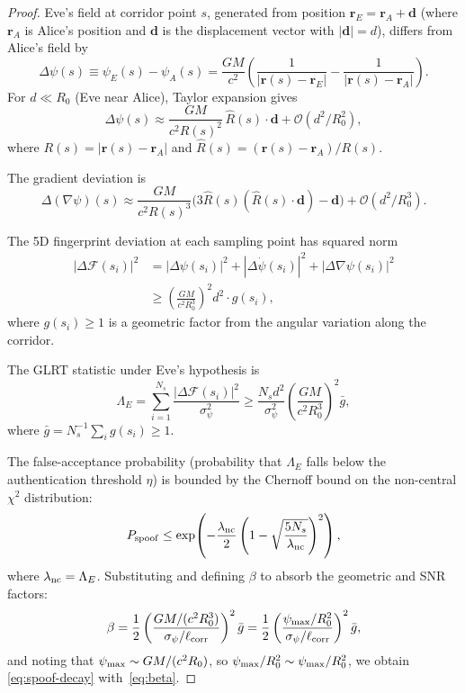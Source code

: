 \documentclass[twocolumn,superscriptaddress,prd,nofootinbib]{revtex4-2}
\newcommand{\order}[1]{\mathcal{O}(#1)}
\newcommand{\Fingerprint}{\mathcal{F}}
\begin{document}
\begin{proof}
Eve's field at corridor point $s$, generated from position
$\mathbf{r}_E = \mathbf{r}_A + \mathbf{d}$ (where $\mathbf{r}_A$ is
Alice's position and $\mathbf{d}$ is the displacement vector with
$|\mathbf{d}| = d$), differs from Alice's field by
\begin{equation}
\Delta\psi(s) \equiv \psi_E(s) - \psi_A(s)
= \frac{GM}{c^2}\left(\frac{1}{|\mathbf{r}(s) - \mathbf{r}_E|}
- \frac{1}{|\mathbf{r}(s) - \mathbf{r}_A|}\right).
\end{equation}
For $d \ll R_0$ (Eve near Alice), Taylor expansion gives
\begin{equation}
\Delta\psi(s) \approx \frac{GM}{c^2 R(s)^2}\,\hat{R}(s)\cdot\mathbf{d}
+ \order{d^2/R_0^2},
\end{equation}
where $R(s) = |\mathbf{r}(s) - \mathbf{r}_A|$ and
$\hat{R}(s) = (\mathbf{r}(s)-\mathbf{r}_A)/R(s)$.

The gradient deviation is
\begin{equation}
\Delta(\nabla\psi)(s) \approx \frac{GM}{c^2 R(s)^3}
\bigl(3\hat{R}(s)(\hat{R}(s)\cdot\mathbf{d}) - \mathbf{d}\bigr)
+ \order{d^2/R_0^3}.
\end{equation}

The 5D fingerprint deviation at each sampling point has squared norm
\begin{align}
|\Delta\Fingerprint(s_i)|^2 &= |\Delta\psi(s_i)|^2
+ |\Delta\dot\psi(s_i)|^2 + |\Delta\nabla\psi(s_i)|^2 \nonumber\\
&\geq \left(\frac{GM}{c^2 R_0^3}\right)^2 d^2
\cdot g(s_i),
\end{align}
where $g(s_i) \geq 1$ is a geometric factor from the angular variation
along the corridor.

The GLRT statistic under Eve's hypothesis is
\begin{equation}
\Lambda_E = \sum_{i=1}^{N_s}\frac{|\Delta\Fingerprint(s_i)|^2}{\sigma_\psi^2}
\geq \frac{N_s d^2}{\sigma_\psi^2}\left(\frac{GM}{c^2 R_0^3}\right)^2
\bar{g},
\end{equation}
where $\bar{g} = N_s^{-1}\sum_i g(s_i) \geq 1$.

The false-acceptance probability (probability that $\Lambda_E$ falls
below the authentication threshold $\eta$) is bounded by the
Chernoff bound on the non-central $\chi^2$ distribution:
\begin{equation}
P_{\rm spoof} \leq \exp\!\left(-\frac{\lambda_{\rm nc}}{2}
\left(1 - \sqrt{\frac{5N_s}{\lambda_{\rm nc}}}\right)^2\right),
\end{equation}
where $\lambda_{\rm nc} = \Lambda_E$. Substituting and defining
$\beta$ to absorb the geometric and SNR factors:
\begin{equation}
\beta = \frac{1}{2}\left(\frac{GM/(c^2 R_0^3)}{\sigma_\psi/\ell_{\rm corr}}\right)^2\bar{g}
= \frac{1}{2}\left(\frac{\psi_{\rm max}/R_0^2}{\sigma_\psi/\ell_{\rm corr}}\right)^2\bar{g},
\end{equation}
and noting that $\psi_{\rm max} \sim GM/(c^2 R_0)$, so
$\psi_{\rm max}/R_0^2 \sim \psi_{\rm max}/R_0^2$, we obtain
\eqref{eq:spoof-decay} with~\eqref{eq:beta}.
\end{proof}
\end{document}

